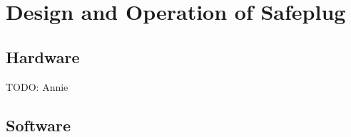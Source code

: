 \section{Design and Operation of Safeplug}
\label{sec:design}

\subsection{Hardware}
TODO: Annie

\subsection{Software}
